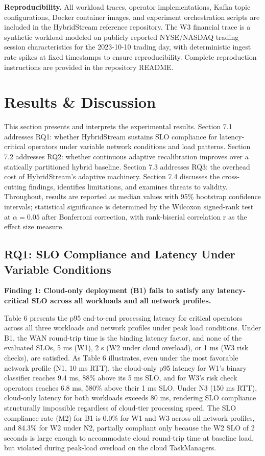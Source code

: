 \documentclass[preprint,review,12pt]{elsarticle}
\begin{document}
\textbf{Reproducibility.} All workload traces, operator implementations, Kafka topic configurations, Docker container images, and experiment orchestration scripts are included in the HybridStream reference repository. The W3 financial trace is a synthetic workload modeled on publicly reported NYSE/NASDAQ trading session characteristics for the 2023-10-10 trading day, with deterministic ingest rate spikes at fixed timestamps to ensure reproducibility. Complete reproduction instructions are provided in the repository README.



\section{Results \& Discussion}\label{results-discussion}

This section presents and interprets the experimental results. Section 7.1 addresses RQ1: whether HybridStream sustains SLO compliance for latency-critical operators under variable network conditions and load patterns. Section 7.2 addresses RQ2: whether continuous adaptive recalibration improves over a statically partitioned hybrid baseline. Section 7.3 addresses RQ3: the overhead cost of HybridStream's adaptive machinery. Section 7.4 discusses the cross-cutting findings, identifies limitations, and examines threats to validity. Throughout, results are reported as median values with 95\% bootstrap confidence intervals; statistical significance is determined by the Wilcoxon signed-rank test at $\alpha = 0.05$ after Bonferroni correction, with rank-biserial correlation r as the effect size measure.

\subsection{RQ1: SLO Compliance and Latency Under Variable Conditions}\label{rq1-slo-compliance-and-latency-under-variable-conditions}

\textbf{Finding 1: Cloud-only deployment (B1) fails to satisfy any latency-critical SLO across all workloads and all network profiles.}

Table 6 presents the p95 end-to-end processing latency for critical operators across all three workloads and network profiles under peak load conditions. Under B1, the WAN round-trip time is the binding latency factor, and none of the evaluated SLOs, 5 ms (W1), 2 s (W2 under cloud overload), or 1 ms (W3 risk checks), are satisfied. As Table 6 illustrates, even under the most favorable network profile (N1, 10 ms RTT), the cloud-only p95 latency for W1's binary classifier reaches 9.4 ms, 88\% above its 5 ms SLO, and for W3's risk check operators reaches 6.8 ms, 580\% above their 1 ms SLO. Under N3 (150 ms RTT), cloud-only latency for both workloads exceeds 80 ms, rendering SLO compliance structurally impossible regardless of cloud-tier processing speed. The SLO compliance rate (M2) for B1 is 0.0\% for W1 and W3 across all network profiles, and 84.3\% for W2 under N2, partially compliant only because the W2 SLO of 2 seconds is large enough to accommodate cloud round-trip time at baseline load, but violated during peak-load overload on the cloud TaskManagers.
\end{document}
